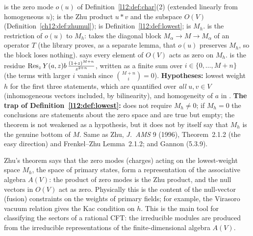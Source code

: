 \begin{dictionary}
 is the zero mode $o(u)$ of Definition~\ref{l12:def:char}(2) (extended linearly from homogeneous $u$);  is the
Zhu product $u*v$ and  the subspace $O(V)$ (Definition~\ref{ch12:def:zhumul});  is
Definition~\ref{l12:def:lowest};  is $M_h$.  is the restriction of $o(u)$ to $M_h$:
 takes the diagonal block $M_\alpha\to M\to M_\alpha$ of an operator $T$ (the library proves, as a separate lemma, that $o(u)$
preserves $M_h$, so the block loses nothing).  says every element of $O(V)$ acts as zero on $M_h$.
 is the residue $\operatorname{Res}_zY(a,z)b\,\frac{(1+z)^{M+n}}{z^{2+n}}$, written as a finite sum over $i\in\{0,\dots,M+n\}$
(the terms with larger $i$ vanish since $\binom{M+n}{i}=0$). \textbf{Hypotheses:} lowest weight $h$ for the first three statements, which
are quantified over \emph{all} $u,v\in V$ (inhomogeneous vectors included, by bilinearity), and homogeneity of $a$ in .
\textbf{The trap of Definition~\ref{l12:def:lowest}:}  does not require $M_h\neq0$; if $M_h=0$ the
conclusions are statements about the zero space and are true but empty; the theorem is not weakened as a hypothesis, but it
does not by itself say that $M_h$ is the genuine bottom of $M$. Same as Zhu, \emph{J.~AMS} 9 (1996), Theorem~2.1.2 (the easy direction) and
Frenkel--Zhu Lemma~2.1.2; and Gannon (5.3.9).
\end{dictionary}

\begin{physics}
Zhu's theorem says that the zero modes (charges) acting on the lowest-weight space $M_h$, the space of primary states, form a representation of the
associative algebra $A(V)$: the product of zero modes is the Zhu product, and the null vectors in $O(V)$ act as zero. Physically this is the content
of the null-vector (fusion) constraints on the weights of primary fields; for example, the Virasoro vacuum relation gives the Kac condition on $h$. This is
the main tool for classifying the sectors of a rational CFT: the irreducible modules are produced from the irreducible representations of the
finite-dimensional algebra $A(V)$.
\end{physics}

